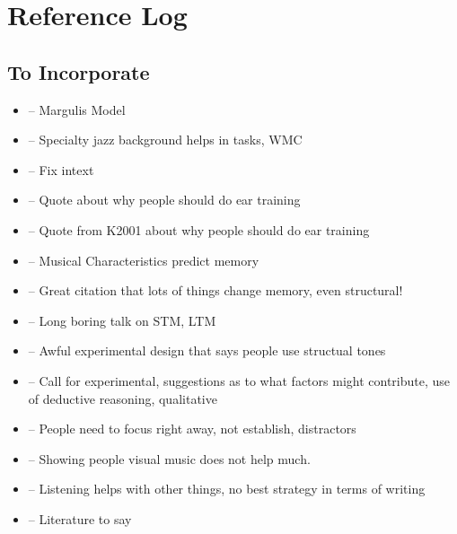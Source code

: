 \documentclass[]{book}
\providecommand{\tightlist}{%
  \setlength{\itemsep}{0pt}\setlength{\parskip}{0pt}}
\theoremstyle{definition}
\theoremstyle{definition}
\theoremstyle{definition}
\theoremstyle{remark}
\begin{document}
\hypertarget{reference-log}{%
\chapter{Reference Log}\label{reference-log}}

\hypertarget{to-incorporate}{%
\section{To Incorporate}\label{to-incorporate}}

\begin{itemize}
\tightlist
\item
  \citep{margulisModelMelodicExpectation2005} -- Margulis Model
\item
  \citep{nicholsScoreOneJazz2018} -- Specialty jazz background helps in
  tasks, WMC
\item
  \citep{NASM201718HandbookPdf2018} -- Fix intext
\item
  \citep{schumann1860musikalische} -- Quote about why people should do
  ear training
\item
  \citep{smith1934solfege} -- Quote from K2001 about why people should
  do ear training
\item
  \citep{longRelationshipsPitchMemory1977} -- Musical Characteristics
  predict memory
\item
  \citep{taylorStrategiesMemoryShort1983} -- Great citation that lots of
  things change memory, even structural!
\item
  \citep{tallaricoStudyThreePhase1974} -- Long boring talk on STM, LTM
\item
  \citep{ouraConstructingRepresentationMelody1991a} -- Awful
  experimental design that says people use structual tones
\item
  \citep{buonviriExplorationUndergraduateMusic2014} -- Call for
  experimental, suggestions as to what factors might contribute, use of
  deductive reasoning, qualitative
\item
  \citep{buonviriEffectsPreparatorySinging2015} -- People need to focus
  right away, not establish, distractors
\item
  \citep{buonviriEffectsMusicNotation2015} -- Showing people visual
  music does not help much.
\item
  \citep{buonviriEffectsTwoListening2017} -- Listening helps with other
  things, no best strategy in terms of writing
\item
  \citep{buonviriMelodicDictationInstruction2015} -- Literature to say

\end{itemize}
\end{document}
